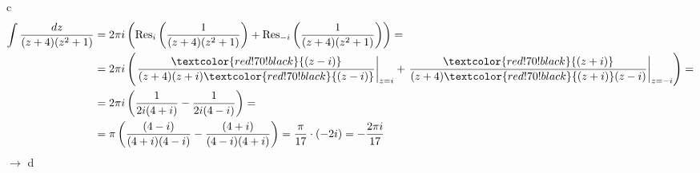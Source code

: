 \textcircled{c}
\begin{align*}
  \int \frac{dz}{(z + 4)(z^2 + 1)} &= 2\pi i\left( \operatorname{Res}_i\left( \frac{1}{(z + 4)(z^2 + 1)} \right) + \operatorname{Res}_{-i}\left( \frac{1}{(z + 4)(z^2 + 1)} \right) \right) = \\
  &= 2\pi i\left( \left. \frac{\textcolor{red!70!black}{(z - i)}}{(z + 4)(z + i)\textcolor{red!70!black}{(z - i)}} \right|_{z = i} + \left. \frac{\textcolor{red!70!black}{(z + i)}}{(z + 4)\textcolor{red!70!black}{(z + i)}(z - i)} \right|_{z = -i} \right) = \\
  &= 2\pi i\left( \frac{1}{2i(4 + i)} - \frac{1}{2i(4 - i)} \right) = \\
  &= \pi\left( \frac{(4 - i)}{(4 + i)(4 - i)} - \frac{(4 + i)}{(4 - i)(4 + i)} \right) = \frac{\pi}{17} \cdot (-2i) = -\frac{2\pi i}{17}
\end{align*}
\hfill $\to$ \textcircled{d}
